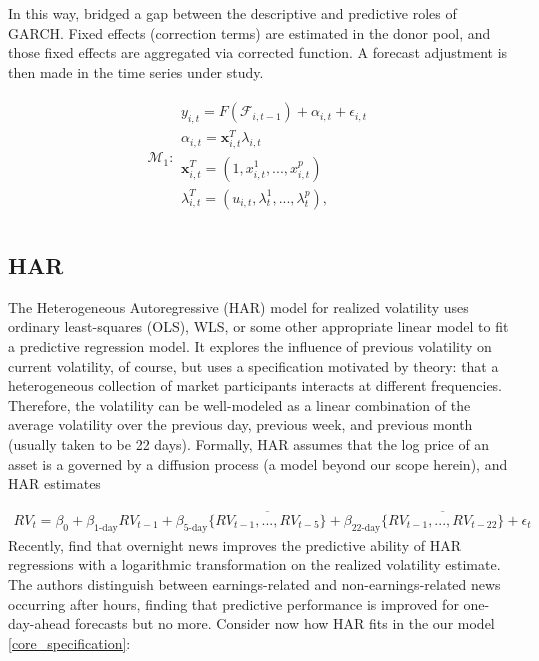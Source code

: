 \documentclass[11pt]{article}
\newcommand{\x}{\textbf{x}}
\def\mc#1{\mathcal{#1}} %
\def\mc#1{\mathcal{#1}}
\theoremstyle{definition}
\begin{document}
In this way, \cite{lundquist2024volatility} bridged a gap between the descriptive and predictive roles of GARCH.  Fixed effects (correction terms) are estimated in the donor pool, and those fixed effects are aggregated via corrected function.  A forecast adjustment is then made in the time series under study.

\begin{align}
  \mc{M}_1 \colon \begin{array}{l}
    y_{i,t} = F(\mathcal{F}_{i,t-1}) + \alpha_{i,t} + \epsilon_{i,t}\\[.2cm]\label{core_specification}
    \alpha_{i,t} = \x^{T}_{i,t}\lambda_{i,t} \\[.2cm]
   \x_{i,t}^{T} = (1,x^{1}_{i,t},...,x^{p}_{i,t})\\[.2cm] 
   \lambda_{i,t}^{T} = (u_{i,t},\lambda^{1}_{t},...,\lambda^{p}_{t}),\\[.2cm]
  \end{array}
  \end{align}

\subsection{HAR}

The Heterogeneous Autoregressive (HAR) model for realized volatility \citep{corsi2009simple}  uses ordinary least-squares (OLS), WLS, or some other appropriate linear model to fit a predictive regression model.  It explores the influence of previous volatility on current volatility, of course, but uses a specification motivated by theory: that a heterogeneous collection of market participants interacts at different frequencies.  Therefore, the volatility can be well-modeled as a linear combination of the average volatility over the previous day, previous week, and previous month (usually taken to be 22 days).  Formally, HAR assumes that the log price of an asset is a governed by a diffusion process (a model beyond our scope herein), and HAR estimates

\begin{align*}
RV_{t} = \beta_{0} + \beta_{\text{1-day}}RV_{t-1} + \beta_{\text{5-day}}\overline{\{RV_{t-1},...,RV_{t-5}\}}+\beta_{\text{22-day}}\overline{\{RV_{t-1},...,RV_{t-22}\}} + \epsilon_{t}
\end{align*}
Recently, \cite{bodilsen2023exploiting} find that overnight news improves the predictive ability of HAR regressions with a logarithmic transformation on the realized volatility estimate.  The authors distinguish between earnings-related and non-earnings-related news occurring after hours, finding that predictive performance is improved for one-day-ahead forecasts but no more.  Consider now how HAR fits in the our model \ref{core_specification}:
\end{document}

